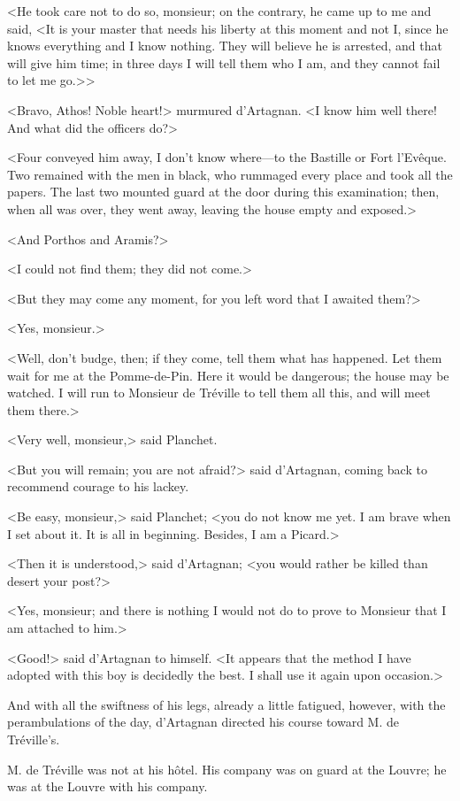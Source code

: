 <He took care not to do so, monsieur; on the contrary, he came up to me and said, <It is your master that needs his liberty at this moment and not I, since he knows everything and I know nothing. They will believe he is arrested, and that will give him time; in three days I will tell them who I am, and they cannot fail to let me go.>> 

<Bravo, Athos! Noble heart!> murmured d'Artagnan. <I know him well there! And what did the officers do?> 

<Four conveyed him away, I don't know where---to the Bastille or Fort l'Evêque. Two remained with the men in black, who rummaged every place and took all the papers. The last two mounted guard at the door during this examination; then, when all was over, they went away, leaving the house empty and exposed.> 

<And Porthos and Aramis?> 

<I could not find them; they did not come.> 

<But they may come any moment, for you left word that I awaited them?> 

<Yes, monsieur.> 

<Well, don't budge, then; if they come, tell them what has happened. Let them wait for me at the Pomme-de-Pin. Here it would be dangerous; the house may be watched. I will run to Monsieur de Tréville to tell them all this, and will meet them there.> 

<Very well, monsieur,> said Planchet. 

<But you will remain; you are not afraid?> said d'Artagnan, coming back to recommend courage to his lackey. 

<Be easy, monsieur,> said Planchet; <you do not know me yet. I am brave when I set about it. It is all in beginning. Besides, I am a Picard.> 

<Then it is understood,> said d'Artagnan; <you would rather be killed than desert your post?> 

<Yes, monsieur; and there is nothing I would not do to prove to Monsieur that I am attached to him.> 

<Good!> said d'Artagnan to himself. <It appears that the method I have adopted with this boy is decidedly the best. I shall use it again upon occasion.> 

And with all the swiftness of his legs, already a little fatigued, however, with the perambulations of the day, d'Artagnan directed his course toward M. de Tréville's. 

M. de Tréville was not at his hôtel. His company was on guard at the Louvre; he was at the Louvre with his company. 

